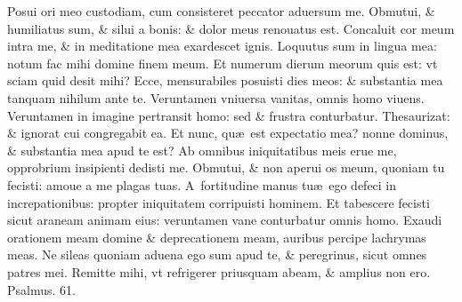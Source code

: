 \documentclass[a5paper,10pt]{book}
\def\ae{æ}
\begin{document}
\begin{multicols*}{2}
\newline \color{red} P\color{black}osui ori meo custodiam, cum consisteret peccator aduersum me.
\newline \color{red} O\color{black}bmutui, \& humiliatus sum, \& silui a bonis: \& dolor meus renouatus est.
\newline \color{red} C\color{black}oncaluit cor meum intra me, \& in meditatione mea exardescet ignis.
\newline \color{red} L\color{black}oquutus sum in lingua mea: notum fac mihi domine finem meum.
\newline \color{red} E\color{black}t numerum dierum meorum quis est: vt sciam quid desit mihi?
\newline \color{red} E\color{black}cce, mensurabiles posuisti dies meos: \& substantia mea tanquam nihilum ante te.
\newline \color{red} V\color{black}eruntamen vniuersa vanitas, omnis homo viuens.
\newline \color{red} V\color{black}eruntamen in imagine pertransit homo: sed \& frustra conturbatur.
\newline \color{red} T\color{black}hesaurizat: \& ignorat cui congregabit ea.
\newline \color{red} E\color{black}t nunc, qu\ae \ est expectatio mea? nonne dominus, \& substantia mea apud te est?
\newline \color{red} A\color{black}b omnibus iniquitatibus meis erue me, opprobrium insipienti dedisti me.
\newline \color{red} O\color{black}bmutui, \& non aperui os meum, quoniam tu fecisti: amoue a me plagas tuas.
\newline \color{red} A\color{black}\ fortitudine manus tu\ae \ ego defeci in increpationibus: propter iniquitatem corripuisti hominem.
\newline \color{red} E\color{black}t tabescere fecisti sicut araneam animam eius: veruntamen vane conturbatur omnis homo.
\newline \color{red} E\color{black}xaudi orationem meam domine \& deprecationem meam, auribus percipe lachrymas meas.
\newline \color{red} N\color{black}e sileas quoniam aduena ego sum apud te, \& peregrinus, sicut omnes patres mei.
\newline \color{red} R\color{black}emitte mihi, vt refrigerer priusquam abeam, \& amplius non ero.
\newline \color{red} Psalmus. \hypertarget{ps61}{61.} \color{black}
\vspace{-.5em}

\end{multicols*}
\end{document}
